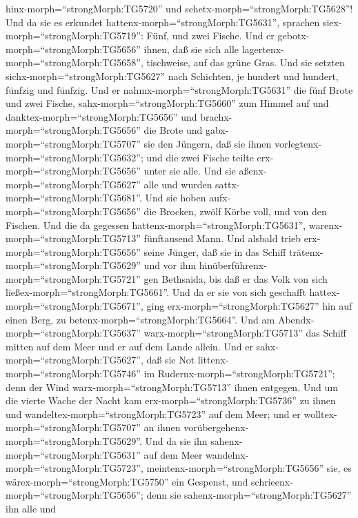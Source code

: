 hinx-morph=``strongMorph:TG5720'' und
sehetx-morph=``strongMorph:TG5628''! Und da sie es erkundet
hattenx-morph=``strongMorph:TG5631'', sprachen
siex-morph=``strongMorph:TG5719'': Fünf, und zwei Fische. 
Und er gebotx-morph=``strongMorph:TG5656'' ihnen, daß sie sich alle
lagertenx-morph=``strongMorph:TG5658'', tischweise, auf das grüne Gras.
 Und sie setzten sichx-morph=``strongMorph:TG5627'' nach
Schichten, je hundert und hundert, fünfzig und fünfzig. 
Und er nahmx-morph=``strongMorph:TG5631'' die fünf Brote und zwei
Fische, sahx-morph=``strongMorph:TG5660'' zum Himmel auf und
danktex-morph=``strongMorph:TG5656'' und
brachx-morph=``strongMorph:TG5656'' die Brote und
gabx-morph=``strongMorph:TG5707'' sie den Jüngern, daß sie ihnen
vorlegtenx-morph=``strongMorph:TG5632''; und die zwei Fische teilte
erx-morph=``strongMorph:TG5656'' unter sie alle.  Und sie
aßenx-morph=``strongMorph:TG5627'' alle und wurden
sattx-morph=``strongMorph:TG5681''.  Und sie hoben
aufx-morph=``strongMorph:TG5656'' die Brocken, zwölf Körbe voll, und von
den Fischen.  Und die da gegessen
hattenx-morph=``strongMorph:TG5631'',
warenx-morph=``strongMorph:TG5713'' fünftausend Mann.  Und
alsbald trieb erx-morph=``strongMorph:TG5656'' seine Jünger, daß sie in
das Schiff trätenx-morph=``strongMorph:TG5629'' und vor ihm
hinüberführenx-morph=``strongMorph:TG5721'' gen Bethsaida, bis daß er
das Volk von sich ließex-morph=``strongMorph:TG5661''.  Und
da er sie von sich geschafft hattex-morph=``strongMorph:TG5671'', ging
erx-morph=``strongMorph:TG5627'' hin auf einen Berg, zu
betenx-morph=``strongMorph:TG5664''.  Und am
Abendx-morph=``strongMorph:TG5637'' warx-morph=``strongMorph:TG5713''
das Schiff mitten auf dem Meer und er auf dem Lande allein.
 Und er sahx-morph=``strongMorph:TG5627'', daß sie Not
littenx-morph=``strongMorph:TG5746'' im
Rudernx-morph=``strongMorph:TG5721''; denn der Wind
warx-morph=``strongMorph:TG5713'' ihnen entgegen. Und um die vierte
Wache der Nacht kam erx-morph=``strongMorph:TG5736'' zu ihnen und
wandeltex-morph=``strongMorph:TG5723'' auf dem Meer;  und
er wolltex-morph=``strongMorph:TG5707'' an ihnen
vorübergehenx-morph=``strongMorph:TG5629''. Und da sie ihn
sahenx-morph=``strongMorph:TG5631'' auf dem Meer
wandelnx-morph=``strongMorph:TG5723'',
meintenx-morph=``strongMorph:TG5656'' sie, es
wärex-morph=``strongMorph:TG5750'' ein Gespenst, und
schrieenx-morph=``strongMorph:TG5656'';  denn sie
sahenx-morph=``strongMorph:TG5627'' ihn alle und
